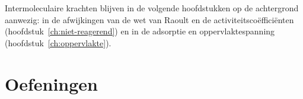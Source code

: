 Intermoleculaire krachten blijven in de volgende hoofdstukken op de achtergrond aanwezig: in de afwijkingen van de wet van Raoult en de activiteitsco\"effici\"enten (hoofdstuk~\ref{ch:niet-reagerend}) en in de adsorptie en oppervlaktespanning (hoofdstuk~\ref{ch:oppervlakte}).

\newpage
\section{Oefeningen}


